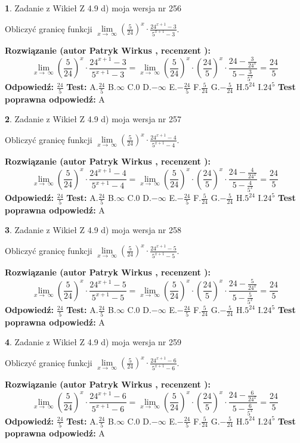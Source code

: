 \documentclass[12pt, a4paper]{article}
\theoremstyle{definition} %
\newtheorem{zad}{}
\newcommand{\zadStart}[1]{\begin{zad}#1\newline}
\newcommand{\zadStop}{\end{zad}}
\newcommand{\rozwStart}[2]{\noindent \textbf{Rozwiązanie (autor #1 , recenzent #2): }\newline}
\newcommand{\rozwStop}{\newline}
\newcommand{\odpStart}{\noindent \textbf{Odpowiedź:}\newline}
\newcommand{\odpStop}{\newline}
\newcommand{\testStart}{\noindent \textbf{Test:}\newline}
\newcommand{\testStop}{\newline}
\newcommand{\kluczStart}{\noindent \textbf{Test poprawna odpowiedź:}\newline}
\newcommand{\kluczStop}{\newline}
\begin{document}
\zadStart{Zadanie z Wikieł Z 4.9 d) moja wersja nr 256}


Obliczyć granicę funkcji  $\lim\limits_{x\to\ \infty}(\frac{5}{24})^{x}\cdot\frac{24^{x+1}-3}{5^{x+1}-3}$.
\zadStop
\rozwStart{Patryk Wirkus}{}
$$\lim\limits_{x\to\ \infty}(\frac{5}{24})^{x}\cdot\frac{24^{x+1}-3}{5^{x+1}-3}=\lim\limits_{x\to\ \infty}(\frac{5}{24})^{x}\cdot(\frac{24}{5})^{x} \cdot \frac{24-\frac{3}{24^{x}}}{5-\frac{3}{5^{x}}} = \frac{24}{5}$$
\rozwStop
\odpStart
$\frac{24}{5}$
\odpStop
\testStart
A.$\frac{24}{5}$ B.$\infty$ C.$0$ D.$-\infty$ E.$-\frac{24}{5}$
F.$\frac{5}{24}$ G.$-\frac{5}{24}$
H.$5^{24}$
I.$24^{5}$
\testStop
\kluczStart
A
\kluczStop



\zadStart{Zadanie z Wikieł Z 4.9 d) moja wersja nr 257}


Obliczyć granicę funkcji  $\lim\limits_{x\to\ \infty}(\frac{5}{24})^{x}\cdot\frac{24^{x+1}-4}{5^{x+1}-4}$.
\zadStop
\rozwStart{Patryk Wirkus}{}
$$\lim\limits_{x\to\ \infty}(\frac{5}{24})^{x}\cdot\frac{24^{x+1}-4}{5^{x+1}-4}=\lim\limits_{x\to\ \infty}(\frac{5}{24})^{x}\cdot(\frac{24}{5})^{x} \cdot \frac{24-\frac{4}{24^{x}}}{5-\frac{4}{5^{x}}} = \frac{24}{5}$$
\rozwStop
\odpStart
$\frac{24}{5}$
\odpStop
\testStart
A.$\frac{24}{5}$ B.$\infty$ C.$0$ D.$-\infty$ E.$-\frac{24}{5}$
F.$\frac{5}{24}$ G.$-\frac{5}{24}$
H.$5^{24}$
I.$24^{5}$
\testStop
\kluczStart
A
\kluczStop



\zadStart{Zadanie z Wikieł Z 4.9 d) moja wersja nr 258}


Obliczyć granicę funkcji  $\lim\limits_{x\to\ \infty}(\frac{5}{24})^{x}\cdot\frac{24^{x+1}-5}{5^{x+1}-5}$.
\zadStop
\rozwStart{Patryk Wirkus}{}
$$\lim\limits_{x\to\ \infty}(\frac{5}{24})^{x}\cdot\frac{24^{x+1}-5}{5^{x+1}-5}=\lim\limits_{x\to\ \infty}(\frac{5}{24})^{x}\cdot(\frac{24}{5})^{x} \cdot \frac{24-\frac{5}{24^{x}}}{5-\frac{5}{5^{x}}} = \frac{24}{5}$$
\rozwStop
\odpStart
$\frac{24}{5}$
\odpStop
\testStart
A.$\frac{24}{5}$ B.$\infty$ C.$0$ D.$-\infty$ E.$-\frac{24}{5}$
F.$\frac{5}{24}$ G.$-\frac{5}{24}$
H.$5^{24}$
I.$24^{5}$
\testStop
\kluczStart
A
\kluczStop



\zadStart{Zadanie z Wikieł Z 4.9 d) moja wersja nr 259}


Obliczyć granicę funkcji  $\lim\limits_{x\to\ \infty}(\frac{5}{24})^{x}\cdot\frac{24^{x+1}-6}{5^{x+1}-6}$.
\zadStop
\rozwStart{Patryk Wirkus}{}
$$\lim\limits_{x\to\ \infty}(\frac{5}{24})^{x}\cdot\frac{24^{x+1}-6}{5^{x+1}-6}=\lim\limits_{x\to\ \infty}(\frac{5}{24})^{x}\cdot(\frac{24}{5})^{x} \cdot \frac{24-\frac{6}{24^{x}}}{5-\frac{6}{5^{x}}} = \frac{24}{5}$$
\rozwStop
\odpStart
$\frac{24}{5}$
\odpStop
\testStart
A.$\frac{24}{5}$ B.$\infty$ C.$0$ D.$-\infty$ E.$-\frac{24}{5}$
F.$\frac{5}{24}$ G.$-\frac{5}{24}$
H.$5^{24}$
I.$24^{5}$
\testStop
\kluczStart
A
\kluczStop
\end{document}
